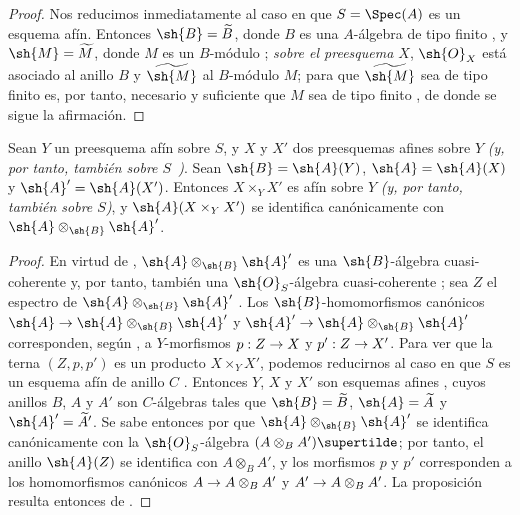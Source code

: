 \documentclass[oneside,10pt]{amsart}
\makeatletter
\newcommand{\ega@arrow}[2]{\mathchoice{#1}{#2}{#2}{#2}}
\renewcommand{\to}{\ega@arrow{\longrightarrow}{\rightarrow}}
\let\EGAOriginalLabel\label
\renewcommand{\label}[1]{\phantomsection\EGAOriginalLabel{#1}}
\makeatother
\begin{document}
\begin{proof}
Nos reducimos inmediatamente al caso en que $S=\Spec(A)$ es un esquema afín.
Entonces $\sh{B}=\widetilde{B}$, donde $B$ es una $A$-álgebra de tipo finito , y $\sh{M}=\widetilde{M}$, donde $M$ es un $B$-módulo ; \emph{sobre el preesquema $X$}, $\sh{O}_X$ está asociado al anillo $B$ y $\widetilde{\sh{M}}$ al $B$-módulo $M$; para que $\widetilde{\sh{M}}$ sea de tipo finito es, por tanto, necesario y suficiente que $M$ sea de tipo finito , de donde se sigue la afirmación.
\end{proof}

\begin{proposition}[1.4.6]
\label{II.1.4.6}
Sean $Y$ un preesquema afín sobre $S$, y $X$ y $X'$ dos preesquemas afines sobre $Y$ \emph{(y, por tanto, también sobre $S$~)}.
Sean $\sh{B}=\sh{A}(Y)$, $\sh{A}=\sh{A}(X)$ y $\sh{A}'=\sh{A}(X')$.
Entonces $X\times_Y X'$ es afín sobre $Y$ \emph{(y, por tanto, también sobre $S$)}, y $\sh{A}(X\times_Y X')$ se identifica canónicamente con $\sh{A}\otimes_\sh{B}\sh{A}'$.
\end{proposition}

\begin{proof}
En virtud de , $\sh{A}\otimes_\sh{B}\sh{A}'$ es una $\sh{B}$-álgebra cuasi-coherente y, por tanto, también una $\sh{O}_S$-álgebra cuasi-coherente ; sea $Z$ el espectro de $\sh{A}\otimes_\sh{B}\sh{A}'$ .
Los $\sh{B}$-homomorfismos canónicos $\sh{A}\to\sh{A}\otimes_\sh{B}\sh{A}'$ y $\sh{A}'\to\sh{A}\otimes_\sh{B}\sh{A}'$ corresponden, según , a $Y$-morfismos $p:Z\to X$ y $p':Z\to X'$.
Para ver que la terna $(Z,p,p')$ es un producto $X\times_Y X'$, podemos reducirnos al caso en que $S$ es un esquema afín de anillo $C$ .
Entonces $Y$, $X$ y $X'$ son esquemas afines , cuyos anillos $B$, $A$ y $A'$ son $C$-álgebras tales que $\sh{B}=\widetilde{B}$, $\sh{A}=\widetilde{A}$ y $\sh{A}'=\widetilde A'$.
Se sabe entonces por  que $\sh{A}\otimes_\sh{B}\sh{A}'$ se identifica canónicamente con la $\sh{O}_S$-álgebra $(A\otimes_B A')\supertilde$; por tanto, el anillo $\sh{A}(Z)$ se identifica con $A\otimes_B A'$, y los morfismos $p$ y $p'$ corresponden a los homomorfismos canónicos $A\to A\otimes_B A'$ y $A'\to A\otimes_B A'$.
La proposición resulta entonces de .
\end{proof}
\end{document}
